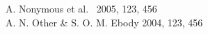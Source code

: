 \documentclass{data/hbue}
\begin{document}






\tableofcontents

\pagestyle{fancy}






\begin{thebibliography}{99}
		A.   Nonymous et al.  \ 2005, 123, 456\\[-20pt]
		A.  N.   Other \& S.  O.  M.   Ebody 2004,  123, 456\\[-20pt]
\end{thebibliography}
\end{document}
